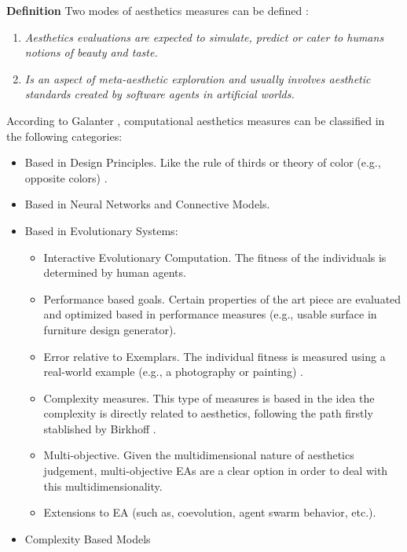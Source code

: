 \documentclass[conference]{IEEEtran}
\begin{document}
{\bf Definition} Two modes of aesthetics measures can be defined \cite{galanter2012computational}: 

\begin{enumerate}
\item {\em Aesthetics evaluations are expected to simulate, predict or cater to humans notions of beauty and taste.} 
\item {\em Is an aspect of meta-aesthetic exploration and usually involves aesthetic standards created by software agents in artificial worlds.}
\end{enumerate}

According to Galanter \cite{galanter2012computational}, computational aesthetics measures can be classified in the following categories:
\begin{itemize}
	\item Based in Design Principles. Like the rule of thirds or theory of color (e.g., opposite colors) \cite{den2012evolving}.
	\item Based in Neural Networks and Connective Models. 
	\item Based in Evolutionary Systems:
		\begin{itemize}
			\item Interactive Evolutionary Computation. The fitness of the individuals is determined by human agents.
			\item Performance based goals. Certain properties of the art piece are evaluated and optimized based in performance measures (e.g., usable surface in furniture design generator). %
			\item Error relative to Exemplars. The individual fitness is measured using a real-world example (e.g., a photography or painting) \cite{dipaola2009incorporating}.
			\item Complexity measures. This type of measures is based in the idea the complexity is directly related to aesthetics, following the path firstly stablished by Birkhoff \cite{birkhoff2003aesthetic}.
			\item Multi-objective. Given the multidimensional nature of aesthetics judgement, multi-objective EAs are a clear option in order to deal with this multidimensionality.
			\item Extensions to EA (such as, coevolution, agent swarm behavior, etc.).
		\end{itemize}
	\item Complexity Based Models
\end{itemize}
\end{document}

